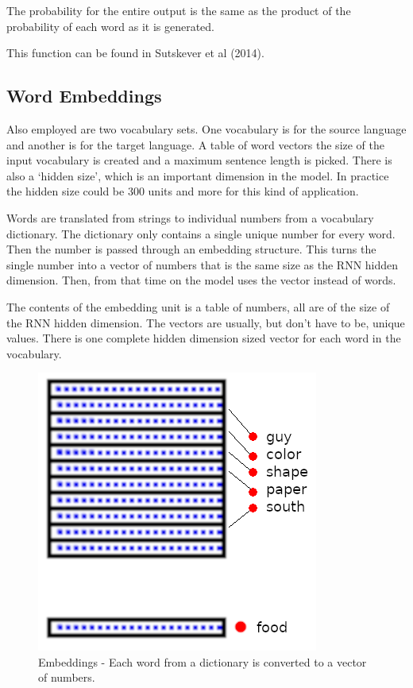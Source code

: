 The probability for the entire output is the same as the product of the probability of each word as it is generated.

This function can be found in Sutskever et al (2014)\cite{DBLP:journals/corr/SutskeverVL14}.


\subsection*{Word Embeddings}

Also employed are two vocabulary sets. One vocabulary is for the source language and another is for the target language. A table of word vectors the size of the input vocabulary is created and a maximum sentence length is picked. There is also a `hidden size', which is an important dimension in the model. In practice the hidden size could be 300 units and more for this kind of application.

Words are translated from strings to individual numbers from a vocabulary dictionary. The dictionary only contains a single unique number for every word. Then the number is passed through an embedding structure. This turns the single number into a vector of numbers that is the same size as the RNN hidden dimension. Then, from that time on the model uses the vector instead of words.

The contents of the embedding unit is a table of numbers, all are of the size of the RNN hidden dimension. The vectors are usually, but don\textquoteright t have to be, unique values. There is one complete hidden dimension sized vector for each word in the vocabulary. 

\begin{figure}[H]
	\begin{center}
		\includegraphics[scale=0.5]{diagram-embedding}
		
		
	\end{center}
	\caption[Word Embeddings]{Embeddings - Each word from a dictionary is converted to a vector of numbers.}
	

\end{figure}

